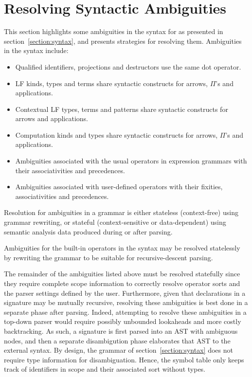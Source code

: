 \section{Resolving Syntactic Ambiguities}\label{section:resolving-grammar-ambiguities}

This section highlights some ambiguities in the syntax for \Beluga as presented in section~\ref{section:syntax}, and presents strategies for resolving them.
Ambiguities in the syntax include:
\begin{itemize}
\item Qualified identifiers, projections and destructors use the same dot operator.
\item \ac{LF} kinds, types and terms share syntactic constructs for arrows, $ \Pi $'s and applications.
\item Contextual \ac{LF} types, terms and patterns share syntactic constructs for arrows and applications.
\item Computation kinds and types share syntactic constructs for arrows, $ \Pi $'s and applications.
\item Ambiguities associated with the usual operators in expression grammars with their associativities and precedences.
\item Ambiguities associated with user-defined operators with their fixities, associativities and precedences.
\end{itemize}

Resolution for ambiguities in a grammar is either stateless (context-free) using grammar rewriting, or stateful (context-sensitive or data-dependent) using semantic analysis data produced during or after parsing.

Ambiguities for the built-in operators in the syntax may be resolved statelessly by rewriting the grammar to be suitable for recursive-descent parsing.

The remainder of the ambiguities listed above must be resolved statefully since they require complete scope information to correctly resolve operator sorts and the parser settings defined by the user.
Furthermore, given that declarations in a \Beluga signature may be mutually recursive, resolving these ambiguities is best done in a separate phase after parsing.
Indeed, attempting to resolve these ambiguities in a top-down parser would require possibly unbounded lookaheads and more costly backtracking.
As such, a \Beluga signature is first parsed into an \ac{AST} with ambiguous nodes, and then a separate disambigution phase elaborates that \ac{AST} to the external syntax.
By design, the grammar of section~\ref{section:syntax} does not require type information for disambiguation.
Hence, the symbol table only keeps track of identifiers in scope and their associated sort without types.

